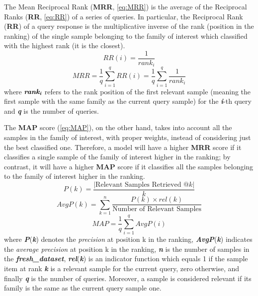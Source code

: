 \documentclass[pdfa%
,cucitura%
]{toptesi}
\begin{document}
The Mean Reciprocal Rank (\textbf{MRR}, \ref{eq:MRR}) is the average of the Reciprocal Ranks (\textbf{RR}, \ref{eq:RR}) of a series of queries. In particular, the Reciprocal Rank (\textbf{RR}) of a query response is the multiplicative inverse of the rank (position in the ranking) of the single sample belonging to the family of interest which classified with the highest rank (it is the closest).
\begin{equation}\label{eq:RR}
	RR(i) = \frac{1}{rank_i}
\end{equation}
\begin{equation}\label{eq:MRR}
	MRR = \frac{1} {q}\sum_{i=1}^{q} RR(i) = \frac{1} {q}\sum_{i=1}^{q} \frac{1}{rank_i}
\end{equation}
where $\textit{\textbf{rank}}_\textit{\textbf{i}}$ refers to the rank position of the first relevant sample (meaning the first sample with the same family as the current query sample) for the \textit{\textbf{i}}-th query and \textit{\textbf{q}} is the number of queries.

The \textbf{MAP} score (\ref{eq:MAP}), on the other hand, takes into account all the samples in the family of interest, with proper weights, instead of considering just the best classified one. Therefore, a model will have a higher \textbf{MRR} score if it classifies a single sample of the family of interest higher in the ranking; by contrast, it will have a higher \textbf{MAP} score if it classifies all the samples belonging to the family of interest higher in the ranking.
\begin{equation}\label{eq:PatK}
	P(k) = \frac{|\text{Relevant Samples Retrieved @} k|}{k}
\end{equation}
\begin{equation}\label{eq:AvgPatK}
	AvgP(k) = \sum_{k=1}^{n} \frac{P(k) \times rel(k)}{\text{Number of Relevant Samples}}
\end{equation}
\begin{equation}\label{eq:MAP}
	MAP = \frac{1}{q} \sum_{i=1}^{q} AvgP(i)
\end{equation}
where \textit{\textbf{P}}(\textit{\textbf{k}}) denotes the \textit{precision} at position k in the ranking, \textit{\textbf{AvgP}}(\textit{\textbf{k}}) indicates the \textit{average precision} at position k in the ranking, \textit{\textbf{n}} is the number of samples in the \textit{\textbf{fresh\_dataset}}, \textit{\textbf{rel}}(\textit{\textbf{k}}) is an indicator function which equals 1 if the sample item at rank \textit{\textbf{k}} is a relevant sample for the current query, zero otherwise, and finally \textit{\textbf{q}} is the number of queries. Moreover, a sample is considered relevant if its family is the same as the current query sample one.
\end{document}
